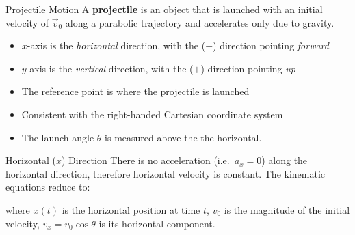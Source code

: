 \documentclass[12pt,compress,aspectratio=169,dvipsnames]{beamer}
\begin{document}
\begin{frame}{Projectile Motion}
  A \textbf{projectile} is an object that is launched with an initial velocity
  of $\vec v_0$ along a parabolic trajectory and accelerates only due to
  gravity.
  \begin{center}
  \end{center}
  \begin{itemize}
  \item $x$-axis is the \emph{horizontal} direction, with the ($+$) direction
    pointing \emph{forward}
  \item $y$-axis is the \emph{vertical} direction, with the ($+$) direction
    pointing \emph{up}
  \item The reference point is where the projectile is launched
  \item Consistent with the right-handed Cartesian coordinate system
  \item The launch angle $\theta$ is measured above the the horizontal.
  \end{itemize}
\end{frame}



\begin{frame}{Horizontal ($x$) Direction}
  There is no acceleration (i.e.\ $a_x=0$) along the horizontal direction,
  therefore horizontal velocity is constant. The kinematic equations reduce to:


  where $x(t)$ is the horizontal position at time $t$, $v_0$ is the
  magnitude of the initial velocity, $v_x=v_0\cos\theta$ is its horizontal
  component.
\end{frame}
\end{document}
